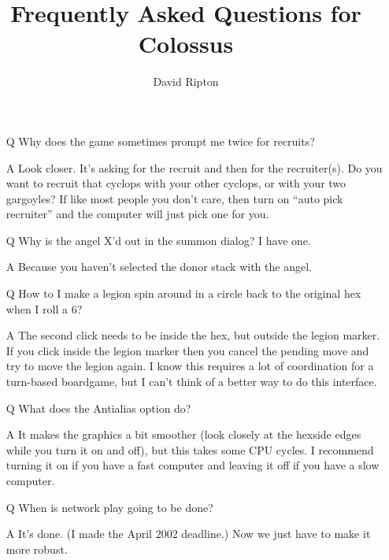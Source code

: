 \documentclass{article}
\begin{document}

\title{Frequently Asked Questions for Colossus}

\author{David Ripton}

\maketitle

\begin{itemize}

\item[Q] Why does the game sometimes prompt me twice for recruits?

\item[A] Look closer. It's asking for the recruit and then for the recruiter(s).
 Do you want to recruit that cyclops with your other cyclops, or with
 your two gargoyles? If like most people you don't care, then turn on 
 ``auto pick recruiter'' and the computer will just pick one for you.

\item[Q] Why is the angel X'd out in the summon dialog?  I have one.

\item[A] Because you haven't selected the donor stack with the angel.

\item[Q] How to I make a legion spin around in a circle back to the original
 hex when I roll a 6? 

\item[A] The second click needs to be inside the hex, but outside the legion 
 marker. If you click inside the legion marker then you cancel the
 pending move and try to move the legion again. I know this requires
 a lot of coordination for a turn-based boardgame, but I can't think
 of a better way to do this interface.


\item[Q] What does the Antialias option do?

\item[A] It makes the graphics a bit smoother (look closely at the hexside
 edges while you turn it on and off), but this takes some CPU cycles. I
 recommend turning it on if you have a fast computer and leaving it off
 if you have a slow computer. 

\item[Q] When is network play going to be done?

\item[A] It's done.  (I made the April 2002 deadline.)  Now we just have to
 make it more robust.



\end{itemize}
\end{document}
